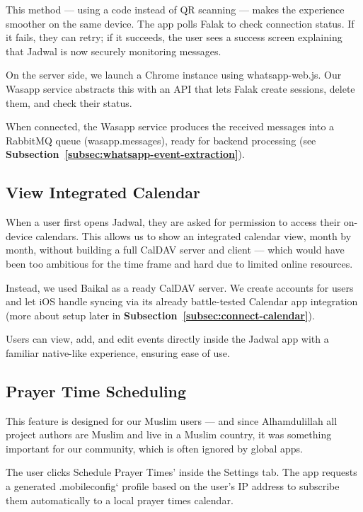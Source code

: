 This method — using a code instead of QR scanning — makes the experience smoother on the same device. The app polls Falak to check connection status. If it fails, they can retry; if it succeeds, the user sees a success screen explaining that Jadwal is now securely monitoring messages.

On the server side, we launch a Chrome instance using whatsapp-web.js. Our Wasapp service abstracts this with an API that lets Falak create sessions, delete them, and check their status.

When connected, the Wasapp service produces the received messages into a RabbitMQ queue (wasapp.messages), ready for backend processing (see \textbf{Subsection~\ref{subsec:whatsapp-event-extraction}}).

\subsection{View Integrated Calendar}

When a user first opens Jadwal, they are asked for permission to access their on-device calendars. This allows us to show an integrated calendar view, month by month, without building a full CalDAV server and client — which would have been too ambitious for the time frame and hard due to limited online resources.

Instead, we used Baikal as a ready CalDAV server. We create accounts for users and let iOS handle syncing via its already battle-tested Calendar app integration (more about setup later in \textbf{Subsection~\ref{subsec:connect-calendar}}).

Users can view, add, and edit events directly inside the Jadwal app with a familiar native-like experience, ensuring ease of use.

\subsection{Prayer Time Scheduling} \label{subsec:schedule-prayer-times}

This feature is designed for our Muslim users — and since Alhamdulillah all project authors are Muslim and live in a Muslim country, it was something important for our community, which is often ignored by global apps.

The user clicks Schedule Prayer Times' inside the Settings tab. The app requests a generated .mobileconfig` profile based on the user's IP address to subscribe them automatically to a local prayer times calendar.

